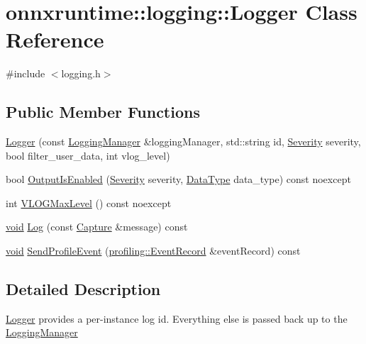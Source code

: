 \hypertarget{classonnxruntime_1_1logging_1_1Logger}{}\section{onnxruntime\+:\+:logging\+:\+:Logger Class Reference}
\label{classonnxruntime_1_1logging_1_1Logger}


{\ttfamily \#include $<$logging.\+h$>$}

\subsection*{Public Member Functions}
\begin{DoxyCompactItemize}
\item 
\mbox{\hyperlink{classonnxruntime_1_1logging_1_1Logger_a93669a2737346f2ee71b1b91eebdf453}{Logger}} (const \mbox{\hyperlink{classonnxruntime_1_1logging_1_1LoggingManager}{Logging\+Manager}} \&logging\+Manager, std\+::string id, \mbox{\hyperlink{namespaceonnxruntime_1_1logging_a7daeb33e1b0e6a6df8c23d142af78e81}{Severity}} severity, bool filter\+\_\+user\+\_\+data, int vlog\+\_\+level)
\item 
bool \mbox{\hyperlink{classonnxruntime_1_1logging_1_1Logger_ac42898a3e3c2623280b244180f28490d}{Output\+Is\+Enabled}} (\mbox{\hyperlink{namespaceonnxruntime_1_1logging_a7daeb33e1b0e6a6df8c23d142af78e81}{Severity}} severity, \mbox{\hyperlink{namespaceonnxruntime_1_1logging_a7342198e47b8ad2717a5d6e28cf68951}{Data\+Type}} data\+\_\+type) const noexcept
\item 
int \mbox{\hyperlink{classonnxruntime_1_1logging_1_1Logger_af2e3439096494a094a9780eb2e238c95}{V\+L\+O\+G\+Max\+Level}} () const noexcept
\item 
\mbox{\hyperlink{mlasi_8h_a88f941d423cb2a819b70a1358982b1a6}{void}} \mbox{\hyperlink{classonnxruntime_1_1logging_1_1Logger_a72e6467ee8cede10dbc9d2aea649f8fe}{Log}} (const \mbox{\hyperlink{classonnxruntime_1_1logging_1_1Capture}{Capture}} \&message) const
\item 
\mbox{\hyperlink{mlasi_8h_a88f941d423cb2a819b70a1358982b1a6}{void}} \mbox{\hyperlink{classonnxruntime_1_1logging_1_1Logger_a7057a0099074535ab5da7ca57b061a28}{Send\+Profile\+Event}} (\mbox{\hyperlink{structonnxruntime_1_1profiling_1_1EventRecord}{profiling\+::\+Event\+Record}} \&event\+Record) const
\end{DoxyCompactItemize}


\subsection{Detailed Description}
\mbox{\hyperlink{classonnxruntime_1_1logging_1_1Logger}{Logger}} provides a per-\/instance log id. Everything else is passed back up to the \mbox{\hyperlink{classonnxruntime_1_1logging_1_1LoggingManager}{Logging\+Manager}} 

